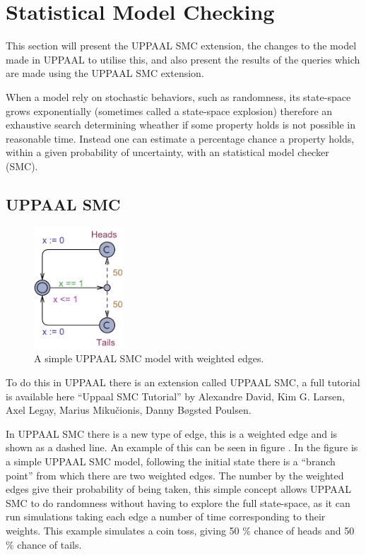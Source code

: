 \section{Statistical Model Checking}

This section will present the UPPAAL SMC extension, the changes to the model made in UPPAAL to utilise this, and also present the results of the queries which are made using the UPPAAL SMC extension.

When a model rely on stochastic behaviors, such as randomness, its state-space grows exponentially (sometimes called a state-space explosion) therefore an exhaustive search determining wheather if some property holds is not possible in reasonable time. 
Instead one can estimate a percentage chance a property holds, within a given probability of uncertainty, with an statistical model checker (SMC). 

\subsection{UPPAAL SMC}
\begin{figure}
\centering
  \includegraphics[width=0.3\textwidth]{Figures/Model/Simple_SMC.pdf} 
\caption{A simple UPPAAL SMC model with weighted edges. }
\label{fig:simpleSMC}
\end{figure}

To do this in UPPAAL there is an extension called UPPAAL SMC, a full tutorial is available here ``Uppaal SMC Tutorial''\cite{DBLP:journals/sttt/DavidLLMP15} by Alexandre David, Kim G. Larsen, Axel Legay, Marius Miku\v{c}ionis, Danny B\o gsted Poulsen.

In UPPAAL SMC there is a new type of edge, this is a weighted edge and is shown as a dashed line. 
An example of this can be seen in figure . 
In the figure is a simple UPPAAL SMC model, following the initial state there is a ``branch point'' from which there are two weighted edges.
The number by the weighted edges give their probability of being taken, this simple concept allows UPPAAL SMC to do randomness without having to explore the full state-space, as it can run simulations taking each edge a number of time corresponding to their weights. 
This example simulates a coin toss, giving 50 \% chance of heads and 50 \% chance of tails. 

